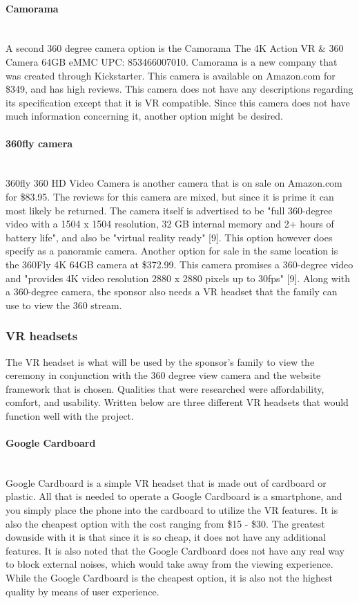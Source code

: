 \documentclass[onecolumn, draftclsnofoot,10pt, compsoc]{IEEEtran}
\begin{document}
    \paragraph{Camorama} \\
    A second 360 degree camera option is the Camorama The 4K Action VR & 360 Camera 64GB eMMC UPC: 853466007010.
    Camorama is a new company that was created through Kickstarter.
    This camera is available on Amazon.com for \$349, and has high reviews.
    This camera does not have any descriptions regarding its specification except that it is VR compatible. 
    Since this camera does not have much information concerning it, another option might be desired.
    
    \paragraph{360fly camera} \\
    360fly 360 HD Video Camera is another camera that is on sale on Amazon.com for \$83.95.
    The reviews for this camera are mixed, but since it is prime it can most likely be returned.
    The camera itself is advertised to be "full 360-degree video with a 1504 x 1504 resolution, 32 GB internal memory and 2+ hours of battery life", and also be "virtual reality ready" [9].
    This option however does specify as a panoramic camera.
    Another option for sale in the same location is the 360Fly 4K 64GB camera at \$372.99.
    This camera promises a 360-degree video and "provides 4K video resolution 2880 x 2880 pixels up to 30fps" [9].
    Along with a 360-degree camera, the sponsor also needs a VR headset that the family can use to view the 360 stream.

    \subsubsection{VR headsets}
    The VR headset is what will be used by the sponsor's family to view the ceremony in conjunction with the 360 degree view camera and the website framework that is chosen.
    Qualities that were researched were affordability, comfort, and usability.
    Written below are three different VR headsets that would function well with the project.
    
    \paragraph{Google Cardboard} \\
    Google Cardboard is a simple VR headset that is made out of cardboard or plastic.
    All that is needed to operate a Google Cardboard is a smartphone, and you simply place the phone into the cardboard to utilize the VR features.
    It is also the cheapest option with the cost ranging from \$15 - \$30.
    The greatest downside with it is that since it is so cheap, it does not have any additional features. 
    It is also noted that the Google Cardboard does not have any real way to block external noises, which would take away from the viewing experience.
    While the Google Cardboard is the cheapest option, it is also not the highest quality by means of user experience.
    
\end{document}
